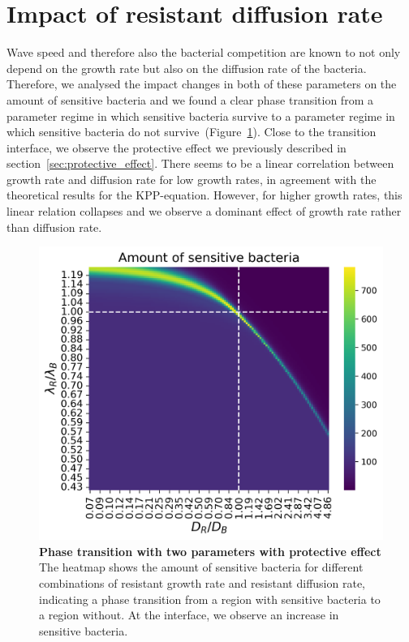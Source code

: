 \section{Impact of resistant diffusion rate}
Wave speed and therefore also the bacterial competition are known to not only depend on the growth rate but also on the diffusion rate of the bacteria. Therefore, we analysed the impact changes in both of these parameters on the amount of sensitive bacteria and we found a clear phase transition from a parameter regime in which sensitive bacteria survive to a parameter regime in which sensitive bacteria do not survive~(Figure~\ref{fig:results_heatmap_effect}). Close to the transition interface, we observe the protective effect we previously described in section~\ref{sec:protective_effect}. There seems to be a linear correlation between growth rate and diffusion rate for low growth rates, in agreement with the theoretical results for the KPP-equation. However, for higher growth rates, this linear relation collapses and we observe a dominant effect of growth rate rather than diffusion rate.
\begin{figure}
\centering
\includegraphics[width=\linewidth]{graphics/2025_09_26_droplets_fig5.png}
\caption{\textbf{Phase transition with two parameters with protective effect} The heatmap shows the amount of sensitive bacteria for different combinations of resistant growth rate and resistant diffusion rate, indicating a phase transition from a region with sensitive bacteria to a region without. At the interface, we observe an increase in sensitive bacteria.}
\label{fig:results_heatmap_effect}
\end{figure}

